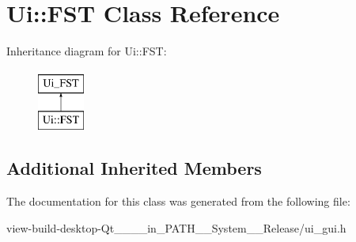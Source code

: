 \hypertarget{classUi_1_1FST}{\section{Ui\-:\-:F\-S\-T Class Reference}
\label{classUi_1_1FST}
}
Inheritance diagram for Ui\-:\-:F\-S\-T\-:\begin{figure}[H]
\begin{center}
\leavevmode
\includegraphics[height=2.000000cm]{classUi_1_1FST}
\end{center}
\end{figure}
\subsection*{Additional Inherited Members}


The documentation for this class was generated from the following file\-:\begin{DoxyCompactItemize}
\item 
view-\/build-\/desktop-\/\-Qt\-\_\-\_\-\_\-\_\-in\-\_\-\-P\-A\-T\-H\-\_\-\-\_\-\-System\-\_\-\-\_\-\-Release/ui\-\_\-gui.\-h\end{DoxyCompactItemize}

